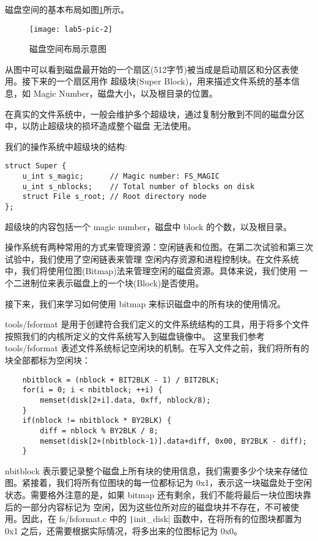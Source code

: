 磁盘空间的基本布局如图\ref{lab5-pic-2}所示。

\begin{figure}[htbp]
  \centering
  \texttt{[image: lab5-pic-2]}
  \caption{磁盘空间布局示意图}\label{lab5-pic-2}
\end{figure}

从图中可以看到磁盘最开始的一个扇区(512字节)被当成是启动扇区和分区表使用。接下来的一个扇区用作
超级块(Super Block)，用来描述文件系统的基本信息，如 Magic Number，磁盘大小，以及根目录的位置。

\begin{note}
在真实的文件系统中，一般会维护多个超级块，通过复制分散到不同的磁盘分区中，以防止超级块的损坏造成整个磁盘
无法使用。
\end{note}

我们的操作系统中超级块的结构:

\begin{verbatim}
struct Super {
    u_int s_magic;      // Magic number: FS_MAGIC
    u_int s_nblocks;    // Total number of blocks on disk
    struct File s_root; // Root directory node
};
\end{verbatim}

超级块的内容包括一个 magic number，磁盘中 block 的个数，以及根目录。

操作系统有两种常用的方式来管理资源：空闲链表和位图。在第二次试验和第三次试验中，我们使用了空闲链表来管理
空闲内存资源和进程控制块。在文件系统中，我们将使用位图(Bitmap)法来管理空闲的磁盘资源。具体来说，我们使用
一个二进制位来表示磁盘上的一个块(Block)是否使用。

接下来，我们来学习如何使用 bitmap 来标识磁盘中的所有块的使用情况。

tools/fsformat 是用于创建符合我们定义的文件系统结构的工具，用于将多个文件按照我们的内核所定义的文件系统写入到磁盘镜像中。
这里我们参考 tools/fsformat 表述文件系统标记空闲块的机制。在写入文件之前，我们将所有的块全部都标为空闲块：

\begin{verbatim}
    nbitblock = (nblock + BIT2BLK - 1) / BIT2BLK;
    for(i = 0; i < nbitblock; ++i) {
        memset(disk[2+i].data, 0xff, nblock/8);
    }
    if(nblock != nbitblock * BY2BLK) {
        diff = nblock % BY2BLK / 8;
        memset(disk[2+(nbitblock-1)].data+diff, 0x00, BY2BLK - diff);
    }
\end{verbatim}

nbitblock 表示要记录整个磁盘上所有块的使用信息，我们需要多少个块来存储位图。紧接着，我们将所有位图块的每一位都标记为
0x1，表示这一块磁盘处于空闲状态。需要格外注意的是，如果 bitmap 还有剩余，我们不能将最后一块位图块靠后的一部分内容标记为
空闲，因为这些位所对应的磁盘块并不存在，不可被使用。因此，在 fs/fsformat.c 中的 \texttt|init_disk|
函数中，在将所有的位图块都置为 0x1 之后，还需要根据实际情况，将多出来的位图标记为 0x0。

